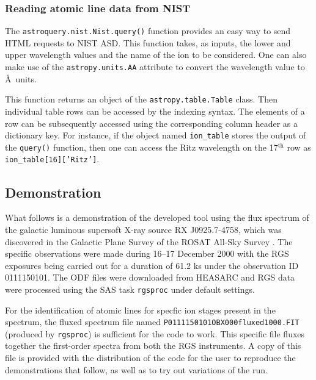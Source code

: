             \subsubsection{Reading atomic line data from NIST} \label{tool:rgs-files:line-collection:NIST}
                The \texttt{astroquery.nist.Nist.query()} function provides an easy way to send HTML requests to NIST ASD. This function takes, as inputs, the lower and upper wavelength values and the name of the ion to be considered. One can also make use of the \texttt{astropy.units.AA} attribute to convert the wavelength value to \AA\ units.
                
                This function returns an object of the \texttt{astropy.table.Table} class. Then individual table rows can be accessed by the indexing syntax. The elements of a row can be subsequently accessed using the corresponding column header as a dictionary key. For instance, if the object named \texttt{ion\_table} stores the output of the \texttt{query()} function, then one can access the Ritz wavelength on the 17$^\text{th}$ row as \texttt{ion\_table[16]['Ritz']}.
        
        \subsection{Demonstration} \label{tool:rgs-files:demonstration}
            What follows is a demonstration of the developed tool using the flux spectrum of the galactic luminous supersoft X-ray source RX J0925.7-4758, which was discovered in the Galactic Plane Survey of the ROSAT All-Sky Survey \cite{motch1994}. The specific observations were made during 16--17 December 2000 with the RGS exposures being carried out for a duration of 61.2 ks \cite{motchXmmNewton2002AA} under the observation ID 0111150101. The ODF files were downloaded from HEASARC and RGS data were processed using the SAS task \texttt{rgsproc} under default settings.
            
            For the identification of atomic lines for specfic ion stages present in the spectrum, the fluxed spectrum file named \texttt{P0111150101OBX000fluxed1000.FIT} (produced by \texttt{rgsproc}) is sufficient for the code to work. This specific file fluxes together the first-order spectra from both the RGS instruments. A copy of this file is provided with the distribution of the code for the user to reproduce the demonstrations that follow, as well as to try out variations of the run.
            
